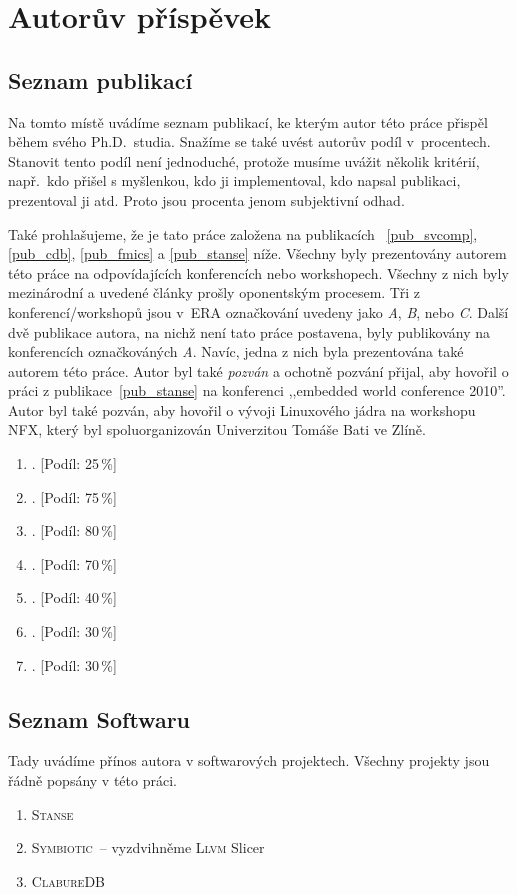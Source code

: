 \documentclass[11pt,a4paper]{article}
\newcommand{\cdb}{\textsc{ClabureDB}\xspace}
\newcommand{\llvm}{\textsc{Llvm}\xspace}
\newcommand{\stan}{\textsc{Stanse}\xspace}
\newcommand{\symbio}{\textsc{Symbiotic}\xspace}
\begin{document}
\clearpage

\section*{Autorův příspěvek}
\subsection*{Seznam publikací}
Na tomto místě uvádíme seznam publikací, ke kterým autor této práce přispěl
během svého Ph.D.\ studia. Snažíme se také uvést autorův podíl v~procentech.
Stanovit tento podíl není jednoduché, protože musíme uvážit několik kritérií,
např.\ kdo přišel s myšlenkou, kdo ji implementoval, kdo napsal publikaci,
prezentoval ji atd. Proto jsou procenta jenom subjektivní odhad.

Také prohlašujeme, že je tato práce založena na publikacích ~\ref{pub_svcomp},
\ref{pub_cdb}, \ref{pub_fmics} a \ref{pub_stanse} níže. Všechny byly
prezentovány autorem této práce na odpovídajících konferencích nebo
workshopech. Všechny z nich byly mezinárodní a uvedené články prošly
oponentským procesem. Tři z konferencí/workshopů jsou v~ERA označkování
uvedeny jako \emph{A}, \emph{B}, nebo \emph{C}. Další dvě publikace autora, na
nichž není tato práce postavena, byly publikovány na konferencích
označkováných \emph{A}.  Navíc, jedna z nich byla prezentována také autorem
této práce. Autor byl také \emph{pozván} a ochotně pozvání přijal, aby hovořil
o práci z publikace~\ref{pub_stanse} na konferenci ,,embedded world conference
2010''.  Autor byl také pozván, aby hovořil o vývoji Linuxového jádra na
workshopu NFX, který byl spoluorganizován Univerzitou Tomáše Bati ve Zlíně.

\begin{enumerate}
\item {}. [Podíl: 25\,\%]

\item \label{pub_svcomp} . [Podíl: 75\,\%]

\item \label{pub_cdb} . [Podíl: 80\,\%]

\item \label{pub_fmics} . [Podíl: 70\,\%]

\item \label{pub_stanse} . [Podíl: 40\,\%]

\item {}. [Podíl: 30\,\%]

\item {}. [Podíl: 30\,\%]

\end{enumerate}

\subsection*{Seznam Softwaru}
Tady uvádíme přínos autora v softwarových projektech. Všechny projekty jsou
řádně popsány v této práci.

\begin{enumerate}
\item \stan
\item \symbio\ -- vyzdvihněme \llvm Slicer
\item \cdb
\end{enumerate}

\clearpage



\end{document}
